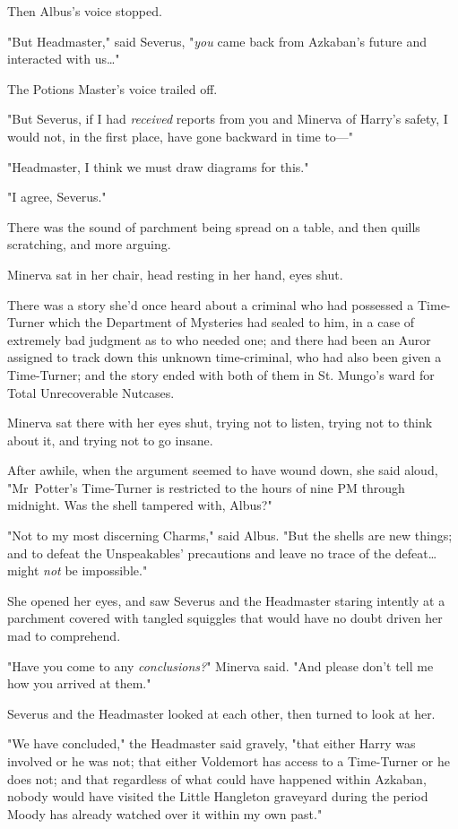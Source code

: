 Then Albus's voice stopped.

"But Headmaster," said Severus, "\emph{you} came back from Azkaban's future and
interacted with us…"

The Potions Master's voice trailed off.

"But Severus, if I had \emph{received} reports from you and Minerva of Harry's
safety, I would not, in the first place, have gone backward in time to---"

"Headmaster, I think we must draw diagrams for this."

"I agree, Severus."

There was the sound of parchment being spread on a table, and then quills
scratching, and more arguing.

Minerva sat in her chair, head resting in her hand, eyes shut.

There was a story she'd once heard about a criminal who had possessed a
Time-Turner which the Department of Mysteries had sealed to him, in a case of
extremely bad judgment as to who needed one; and there had been an Auror
assigned to track down this unknown time-criminal, who had also been given a
Time-Turner; and the story ended with both of them in St. Mungo's ward for
Total Unrecoverable Nutcases.

Minerva sat there with her eyes shut, trying not to listen, trying not to think
about it, and trying not to go insane.

After awhile, when the argument seemed to have wound down, she said aloud,
"Mr~Potter's Time-Turner is restricted to the hours of nine PM through
midnight. Was the shell tampered with, Albus?"

"Not to my most discerning Charms," said Albus. "But the shells are new things;
and to defeat the Unspeakables' precautions and leave no trace of the
defeat…might \emph{not} be impossible."

She opened her eyes, and saw Severus and the Headmaster staring intently at a
parchment covered with tangled squiggles that would have no doubt driven her
mad to comprehend.

"Have you come to any \emph{conclusions?}" Minerva said. "And please don't tell
me how you arrived at them."

Severus and the Headmaster looked at each other, then turned to look at her.

"We have concluded," the Headmaster said gravely, "that either Harry was
involved or he was not; that either Voldemort has access to a Time-Turner or he
does not; and that regardless of what could have happened within Azkaban,
nobody would have visited the Little Hangleton graveyard during the period
Moody has already watched over it within my own past."

